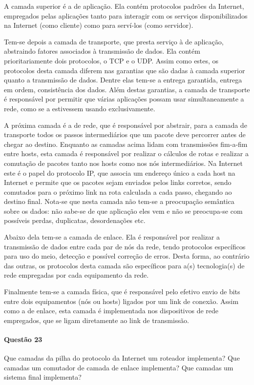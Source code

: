 A camada superior é a de aplicação. Ela contém protocolos padrões da Internet, empregados pelas aplicações tanto para interagir com os serviços disponibilizados na Internet (como cliente) como para serví-los (como servidor).

Tem-se depois a camada de transporte, que presta serviço à de aplicação, abstraindo fatores associados à transmissão de dados.
Ela contém prioritariamente dois protocolos, o TCP e o UDP. Assim como estes, os protocolos desta camada diferem nas garantias que são dadas à camada superior quanto a transmissão de dados.
Dentre elas tem-se a entrega garantida, entrega em ordem, consistência dos dados.
Além destas garantias, a camada de transporte é responsável por permitir que várias aplicações possam usar simultaneamente a rede, como se a estivessem usando exclusivamente.

A próxima camada é a de rede, que é responsável por abstrair, para a camada de transporte todos os passos intermediários que um pacote deve percorrer antes de chegar ao destino.
Enquanto as camadas acima lidam com transmissões fim-a-fim entre hosts, esta camada é responsável por realizar o cálculos de rotas e realizar a comutação de pacotes tanto nos hosts como nos nós intermediários.
Na Internet este é o papel do protocolo IP, que associa um endereço único a cada host na Internet e permite que os pacotes sejam enviados pelos links corretos, sendo comutados para o próximo link na rota calculada a cada passo, chegando ao destino final.
Nota-se que nesta camada não tem-se a preocupação semântica sobre os dados: não sabe-se de que aplicação eles vem e não se preocupa-se com possíveis perdas, duplicatas, desordenações etc.

Abaixo dela tem-se a camada de enlace. Ela é responsável por realizar a transmissão de dados entre cada par de nós da rede, tendo protocolos específicos para uso do meio, detecção e possível correção de erros. Desta forma, ao contrário das outras, os protocolos desta camada são específicos para a(s) tecnologia(s) de rede empregadas por cada equipamento da rede.

Finalmente tem-se a camada física, que é responsável pelo efetivo envio de bits entre dois equipamentos (nós ou hosts) ligados por um link de conexão.
Assim como a de enlace, esta camada é implementada nos dispositivos de rede empregados, que se ligam diretamente ao link de transmissão.

\paragraph{Questão 23}
Que camadas da pilha do protocolo da Internet um roteador implementa? Que camadas um comutador de camada de enlace implementa? Que camadas um sistema final implementa?

